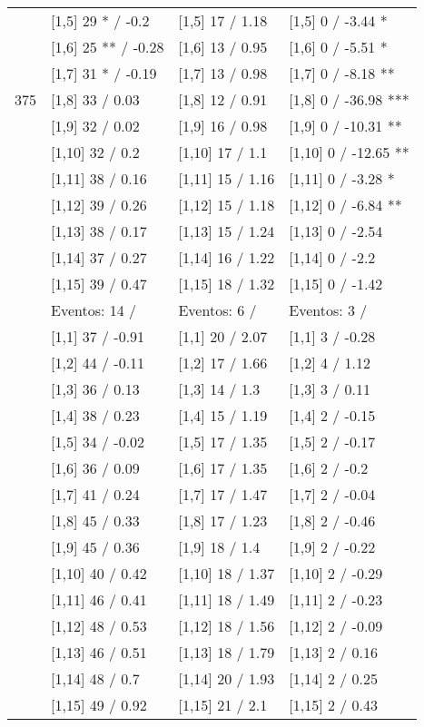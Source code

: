 \begin{table}
\begin{tabular}[t]{llll}
 & {}[1,5] 29 * / -0.2 & {}[1,5] 17  / 1.18 & {}[1,5] 0  / -3.44 *\\
 & {}[1,6] 25 ** / -0.28 & {}[1,6] 13  / 0.95 & {}[1,6] 0  / -5.51 *\\
 & {}[1,7] 31 * / -0.19 & {}[1,7] 13  / 0.98 & {}[1,7] 0  / -8.18 **\\
375 & {}[1,8] 33  / 0.03 & {}[1,8] 12  / 0.91 & {}[1,8] 0  / -36.98 ***\\
\addlinespace
 & {}[1,9] 32  / 0.02 & {}[1,9] 16  / 0.98 & {}[1,9] 0  / -10.31 **\\
 & {}[1,10] 32  / 0.2 & {}[1,10] 17  / 1.1 & {}[1,10] 0  / -12.65 **\\
 & {}[1,11] 38  / 0.16 & {}[1,11] 15  / 1.16 & {}[1,11] 0  / -3.28 *\\
 & {}[1,12] 39  / 0.26 & {}[1,12] 15  / 1.18 & {}[1,12] 0  / -6.84 **\\
 & {}[1,13] 38  / 0.17 & {}[1,13] 15  / 1.24 & {}[1,13] 0  / -2.54\\
\addlinespace
 & {}[1,14] 37  / 0.27 & {}[1,14] 16  / 1.22 & {}[1,14] 0  / -2.2\\
 & {}[1,15] 39  / 0.47 & {}[1,15] 18  / 1.32 & {}[1,15] 0  / -1.42\\
 & Eventos:  14 / & Eventos:  6 / & Eventos:  3 /\\
 & {}[1,1] 37  / -0.91 & {}[1,1] 20  / 2.07 & {}[1,1] 3  / -0.28\\
 & {}[1,2] 44  / -0.11 & {}[1,2] 17  / 1.66 & {}[1,2] 4  / 1.12\\
\addlinespace
 & {}[1,3] 36  / 0.13 & {}[1,3] 14  / 1.3 & {}[1,3] 3  / 0.11\\
 & {}[1,4] 38  / 0.23 & {}[1,4] 15  / 1.19 & {}[1,4] 2  / -0.15\\
 & {}[1,5] 34  / -0.02 & {}[1,5] 17  / 1.35 & {}[1,5] 2  / -0.17\\
 & {}[1,6] 36  / 0.09 & {}[1,6] 17  / 1.35 & {}[1,6] 2  / -0.2\\
 & {}[1,7] 41  / 0.24 & {}[1,7] 17  / 1.47 & {}[1,7] 2  / -0.04\\
\addlinespace
500 & {}[1,8] 45  / 0.33 & {}[1,8] 17  / 1.23 & {}[1,8] 2  / -0.46\\
 & {}[1,9] 45  / 0.36 & {}[1,9] 18  / 1.4 & {}[1,9] 2  / -0.22\\
 & {}[1,10] 40  / 0.42 & {}[1,10] 18  / 1.37 & {}[1,10] 2  / -0.29\\
 & {}[1,11] 46  / 0.41 & {}[1,11] 18  / 1.49 & {}[1,11] 2  / -0.23\\
 & {}[1,12] 48  / 0.53 & {}[1,12] 18  / 1.56 & {}[1,12] 2  / -0.09\\
\addlinespace
 & {}[1,13] 46  / 0.51 & {}[1,13] 18  / 1.79 & {}[1,13] 2  / 0.16\\
 & {}[1,14] 48  / 0.7 & {}[1,14] 20  / 1.93 & {}[1,14] 2  / 0.25\\
 & {}[1,15] 49  / 0.92 & {}[1,15] 21  / 2.1 & {}[1,15] 2  / 0.43\\
\bottomrule
\end{tabular}
\end{table}
